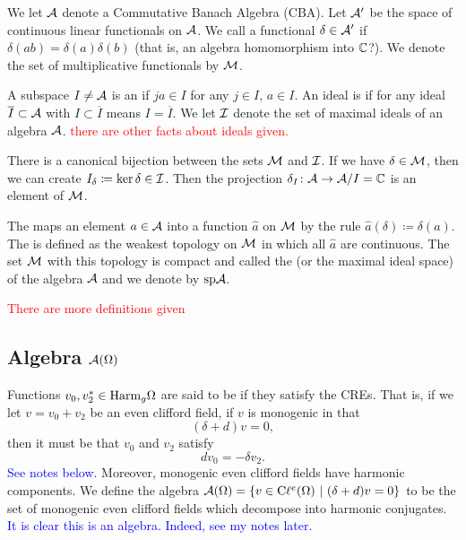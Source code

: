 We let $\mathcal{A}$ denote a Commutative Banach Algebra (CBA). Let $\mathcal{A}'$ be the space of continuous linear functionals on $\mathcal{A}$.  We call a functional $\delta\in \mathcal{A}'$  if $\delta(ab)=\delta(a)\delta(b)$  (that is, an algebra homomorphism into $\mathbb{C}$?). We denote the set of multiplicative functionals by $\mathcal{M}$.

 A subspace $I\neq \mathcal{A}$ is an  if $ja\in I$ for any $j\in I$, $a\in I$.  An ideal is  if for any ideal $\overline{I}\subset \mathcal{A}$ with $I\subset \overline{I}$ means $I=\overline{I}$. We let $\mathcal{I}$ denote the set of maximal ideals of an algebra $\mathcal{A}$. \textcolor{red}{there are other facts about ideals given.}

There is a canonical bijection between the sets $\mathcal{M}$ and $\mathcal{I}$. If we have $\delta \in \mathcal{M}$, then we can create $I_\delta\coloneqq \ker \delta \in \mathcal{I}$. Then the projection $\delta_I\colon \mathcal{A} \to \mathcal{A}/I=\mathbb{C}$ is an element of $\mathcal{M}$.  

The  maps an element $a\in \mathcal{A}$ into a function $\hat{a}$ on $\mathcal{M}$ by the rule $\hat{a}(\delta)\coloneqq \delta(a)$. The  is defined as the weakest topology on $\mathcal{M}$ in which all $\hat{a}$ are continuous. The set $\mathcal{M}$ with this topology is compact and called the  (or the maximal ideal space) of the algebra $\mathcal{A}$ and we denote by $\mathrm{sp} \mathcal{A}$.

\textcolor{red}{There are more definitions given}

\subsection{Algebra $\mathcal{A} (\Omega)$}

Functions $v_0,v_2^* \in \mathrm{Harm}_g \Omega$ are said to be  if they satisfy the CREs. That is, if we let $v=v_0+v_2$ be an even clifford field, if $v$ is monogenic in that
\[
(\delta + d)v = 0,
\]
then it must be that $v_0$ and $v_2$ satisfy
\[
dv_0 = -\delta v_2.
\]
\textcolor{blue}{See notes below.} Moreover, monogenic even clifford fields have harmonic components. We define the algebra $\mathcal{A}(\Omega)=\{v\in \mathrm{C}\ell^e(\Omega) ~\vert~ (\delta+d)v=0\}$ to be the set of monogenic even clifford fields which decompose into harmonic conjugates.  \textcolor{blue}{It is clear this is an algebra. Indeed, see my notes later.}

